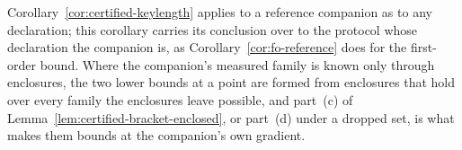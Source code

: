 
Corollary~\ref{cor:certified-keylength} applies to a reference companion as
to any declaration; this corollary carries its conclusion over to the
protocol whose declaration the companion is, as
Corollary~\ref{cor:fo-reference} does for the first-order bound. Where the
companion's measured family is known only through enclosures, the two lower
bounds at a point are formed from enclosures that hold over every family the
enclosures leave possible, and part~(c) of
Lemma~\ref{lem:certified-bracket-enclosed}, or part~(d) under a dropped set,
is what makes them bounds at the companion's own gradient.

